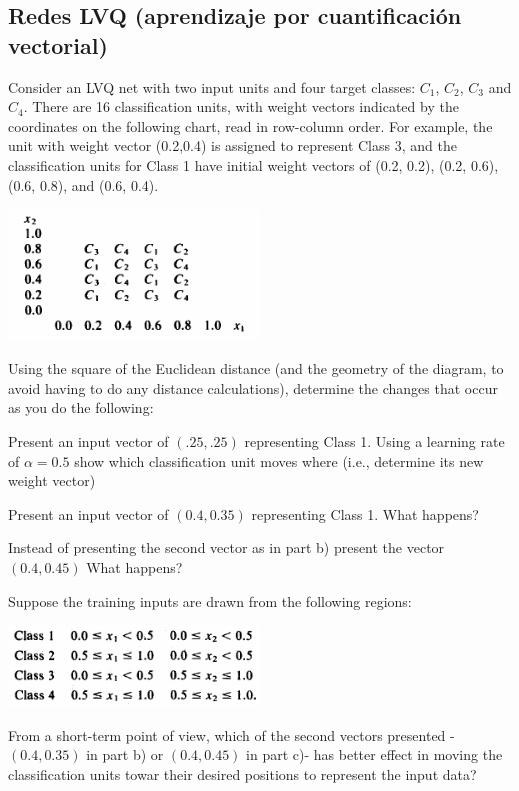 \subsection{Redes LVQ (aprendizaje por cuantificación vectorial)}
\begin{problem}[5]
Consider an LVQ net with two input units and four target classes: $C_1$, $C_2$, $C_3$ and $C_4$. There are 16 classification units, with weight vectors indicated by the coordinates on the following chart, read in row-column order. For example, the unit with weight vector (0.2,0.4) is assigned to represent Class 3, and the classification units for Class 1 have initial weight vectors of (0.2, 0.2), (0.2, 0.6), (0.6, 0.8), and (0.6, 0.4).
\begin{center}
\includegraphics[width=0.5\textwidth]{img/figure4-5.png}
\end{center}
Using the square of the Euclidean distance (and the geometry of the diagram, to avoid having to do any distance calculations), determine the changes that occur as you do the following:

\ppart Present an input vector of $(.25, .25)$ representing Class 1. Using a learning rate of $α=0.5$ show which classification unit moves where (i.e., determine its new weight vector)

\ppart Present an input vector of $(0.4,0.35)$ representing Class 1. What happens?

\ppart Instead of presenting the second vector as in part b) present the vector $(0.4,0.45)$ What happens?

\ppart Suppose the training inputs are drawn from the following regions:
\begin{center}
\includegraphics[width=0.5\textwidth]{img/figure4-5-d.png}
\end{center}

From a short-term point of view, which of the second vectors presented -$(0.4,0.35)$ in part b) or $(0.4,0.45)$ in part c)- has better effect in moving the classification units towar their desired positions to represent the input data?
\solution


\end{problem}
